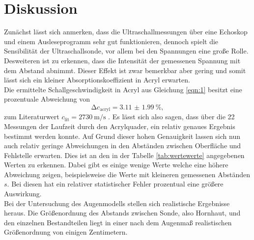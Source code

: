 \section{Diskussion}

Zunächst lässt sich anmerken, dass die Ultraschallmessungen über eine Echoskop und einem Ausleseprogramm sehr gut funktionieren, dennoch spielt die Sensibilität 
der Ultraschallsonde, vor allem bei den Spannungen eine große Rolle. Desweiteren ist zu erkennen, dass die Intensität der gemessenen Spannung mit dem Abstand abnimmt. Dieser Effekt ist zwar bemerkbar aber gering und somit lässt 
sich ein kleiner Absorptionskoeffizient in Acryl erwarten.
\\
\newline
Die ermittelte Schallgeschwindigkeit in Acryl aus Gleichung \ref{eqn:1} besitzt eine prozentuale Abweichung von
\begin{equation}
\increment c_{\text{acryl}} = \SI{3.11(199)}{\percent},
\end{equation}
zum Literaturwert $c_{\text{lit}} = \SI{2730}{\meter\per\second}$ \cite{online}. Es lässt sich also sagen, dass über die 22 Messungen der Laufzeit durch
den Acrylquader, ein relativ genaues Ergebnis bestimmt werden konnte. Auf Grund dieser hohen Genauigkeit lassen sich nun auch relativ geringe Abweichungen 
in den Abständen zwischen Oberfläche und Fehlstelle erwarten. Dies ist an den in der Tabelle \ref{tab:wertewerte} angegebenen Werten zu erkennen. Dabei gibt es einige wenige Werte welche eine höhere Abweichung
zeigen, beispielsweise die Werte mit kleineren gemessenen Abständen $s$. Bei diesen hat ein relativer statistischer Fehler prozentual eine größere Auswirkung. 
\\
\newline
Bei der Untersuchung des Augenmodells stellen sich realistische Ergebnisse heraus. Die Größenordnung des Abstands zwischen Sonde, also Hornhaut, und den einzelnen Bestandteilen liegt in einer nach dem Augenmaß realistischen Größenordnung von einigen Zentimetern.
